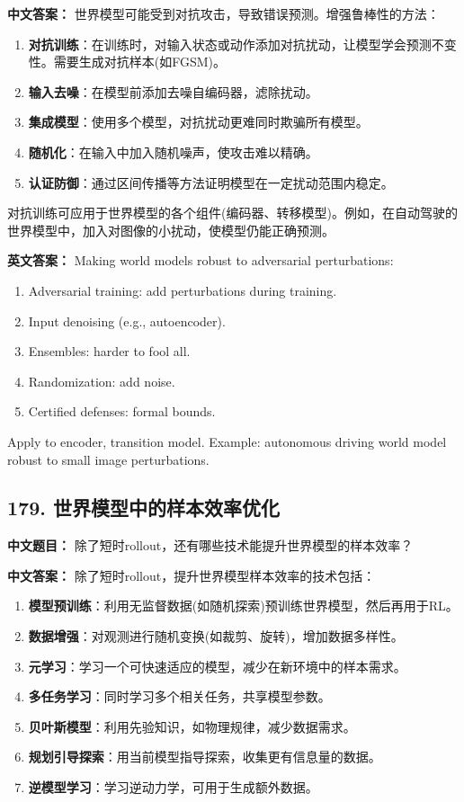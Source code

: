 \documentclass[10pt,a4paper]{ctexart}
\begin{document}
\textbf{中文答案：}  
世界模型可能受到对抗攻击，导致错误预测。增强鲁棒性的方法：

\begin{enumerate}
    \item \textbf{对抗训练}：在训练时，对输入状态或动作添加对抗扰动，让模型学会预测不变性。需要生成对抗样本(如FGSM)。
    \item \textbf{输入去噪}：在模型前添加去噪自编码器，滤除扰动。
    \item \textbf{集成模型}：使用多个模型，对抗扰动更难同时欺骗所有模型。
    \item \textbf{随机化}：在输入中加入随机噪声，使攻击难以精确。
    \item \textbf{认证防御}：通过区间传播等方法证明模型在一定扰动范围内稳定。
\end{enumerate}

对抗训练可应用于世界模型的各个组件(编码器、转移模型)。例如，在自动驾驶的世界模型中，加入对图像的小扰动，使模型仍能正确预测。

\textbf{英文答案：}  
Making world models robust to adversarial perturbations:

\begin{enumerate}
    \item Adversarial training: add perturbations during training.
    \item Input denoising (e.g., autoencoder).
    \item Ensembles: harder to fool all.
    \item Randomization: add noise.
    \item Certified defenses: formal bounds.
\end{enumerate}

Apply to encoder, transition model. Example: autonomous driving world model robust to small image perturbations.

\subsection*{179. 世界模型中的样本效率优化}
\textbf{中文题目：} 除了短时rollout，还有哪些技术能提升世界模型的样本效率？

\textbf{中文答案：}  
除了短时rollout，提升世界模型样本效率的技术包括：

\begin{enumerate}
    \item \textbf{模型预训练}：利用无监督数据(如随机探索)预训练世界模型，然后再用于RL。
    \item \textbf{数据增强}：对观测进行随机变换(如裁剪、旋转)，增加数据多样性。
    \item \textbf{元学习}：学习一个可快速适应的模型，减少在新环境中的样本需求。
    \item \textbf{多任务学习}：同时学习多个相关任务，共享模型参数。
    \item \textbf{贝叶斯模型}：利用先验知识，如物理规律，减少数据需求。
    \item \textbf{规划引导探索}：用当前模型指导探索，收集更有信息量的数据。
    \item \textbf{逆模型学习}：学习逆动力学，可用于生成额外数据。
\end{enumerate}
\end{document}
